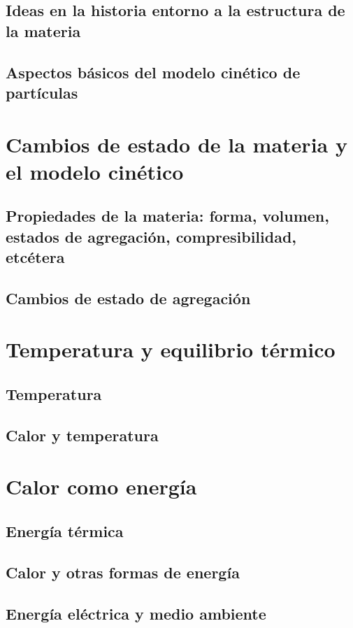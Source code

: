 \documentclass[11pt]{book}
\begin{document}
\subsection{Ideas en la historia entorno a la estructura de la materia}
\subsection{Aspectos básicos del modelo cinético de partículas}

\section{Cambios de estado de la materia y el modelo cinético}
\subsection{Propiedades de la materia: forma, volumen, estados de agregación, compresibilidad, etcétera}
\subsection{Cambios de estado de agregación}

\section{Temperatura y equilibrio térmico}
\subsection{Temperatura}
\subsection{Calor y temperatura}

\section{Calor como energía}
\subsection{Energía térmica}
\subsection{Calor y otras formas de energía}
\subsection{Energía eléctrica y medio ambiente}
\end{document}
